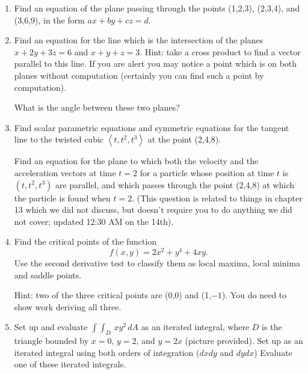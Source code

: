 \documentclass[12pt]{article}
\begin{document}
\begin{enumerate}

\item  Find an  equation of the plane passing through the points (1,2,3),  (2,3,4), and (3,6,9), in the form $ax+by+cz=d$.

\newpage

\item  Find an equation for the line which is the intersection of the planes $x+2y+3z=6$ and $x+y+z=3$.  Hint:  take a cross product to find a vector parallel to this line.  If you are alert you may notice a point which is on both planes without computation (certainly you can find such a point by computation).


\vspace{3 in}

What is the angle between these two planes?

\newpage

\item  Find scalar parametric equations and symmetric equations for the tangent line to the twisted cubic $\left<t,t^2,t^3\right>$ at the point (2,4,8).

\vspace{3 in}

Find an equation for the plane to which both the velocity and the acceleration vectors at time $t=2$ for a particle whose position at time $t$ is $(t,t^2,t^3)$ are parallel, and which passes through the point (2,4,8) at which the particle is found when $t=2$.  (This question is related to things in chapter 13 which we did not discuss, but doesn't require you to do anything we did not cover;  updated 12:30 AM on the 14th).



\newpage

\item  Find the  critical points of the function $$f(x,y)=2x^2+y^4+4xy.$$  Use the second derivative test to classify them as local maxima, local minima and saddle points.

Hint:  two of the three critical points are (0,0) and (1,$-1$).  You do need to show work deriving all three.

\newpage

\item  Set up and evaluate $\int\int_D \, xy^2 \, dA$ as an iterated integral, where $D$ is the triangle bounded by
$x=0$, $y=2$, and $y=2x$ (picture provided).  Set up as an iterated integral using  both orders of integration ($dxdy$ and $dydx$)   Evaluate one of these iterated integrals.

\newpage


\end{enumerate}
\end{document}
